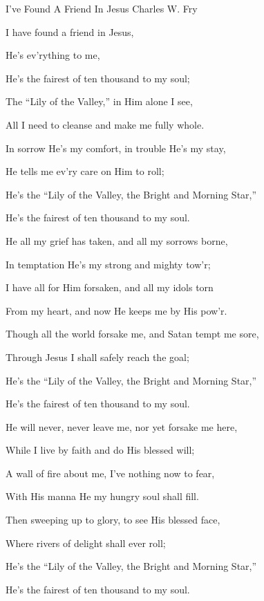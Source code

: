 \documentclass[12pt]{book}
\begin{document}
\begin{song}{I've Found A Friend In Jesus}{}
  {\SBPubDom}
  {Charles W. Fry}
  {}
  {}

  \begin{SBVerse}
    I have found a friend in Jesus,

    He's ev'rything to me,

    He's the fairest of ten thousand to my soul;

    The ``Lily of the Valley,'' in Him alone I see,

    All I need to cleanse and make me fully whole.

    In sorrow He's my comfort, in trouble He's my stay,

    He tells me ev'ry care on Him to roll;

    He's the ``Lily of the Valley, the Bright and Morning Star,''

    He's the fairest of ten thousand to my soul.
  \end{SBVerse}

  \begin{SBVerse}
    He all my grief has taken, and all my sorrows borne,

    In temptation He's my strong and mighty tow'r;

    I have all for Him forsaken, and all my idols torn

    From my heart, and now He keeps me by His pow'r.

    Though all the world forsake me, and Satan tempt me sore,

    Through Jesus I shall safely reach the goal;

    He's the ``Lily of the Valley, the Bright and Morning Star,''

    He's the fairest of ten thousand to my soul.
  \end{SBVerse}

  \begin{SBVerse}
    He will never, never leave me, nor yet forsake me here,

    While I live by faith and do His blessed will;

    A wall of fire about me, I've nothing now to fear,

    With His manna He my hungry soul shall fill.

    Then sweeping up to glory, to see His blessed face,

    Where rivers of delight shall ever roll;

    He's the ``Lily of the Valley, the Bright and Morning Star,''

    He's the fairest of ten thousand to my soul.
  \end{SBVerse}
\end{song}
\end{document}
